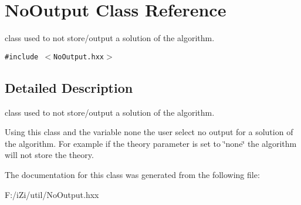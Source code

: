 \section{No\-Output Class Reference}
\label{class_no_output}
class used to not store/output a solution of the algorithm.  


{\tt \#include $<$No\-Output.hxx$>$}



\subsection{Detailed Description}
class used to not store/output a solution of the algorithm. 

Using this class and the variable none the user select no output for a solution of the algorithm. For example if the theory parameter is set to \char`\"{}none\char`\"{} the algorithm will not store the theory. 



The documentation for this class was generated from the following file:\begin{CompactItemize}
\item 
F:/i\-Zi/util/No\-Output.hxx\end{CompactItemize}
